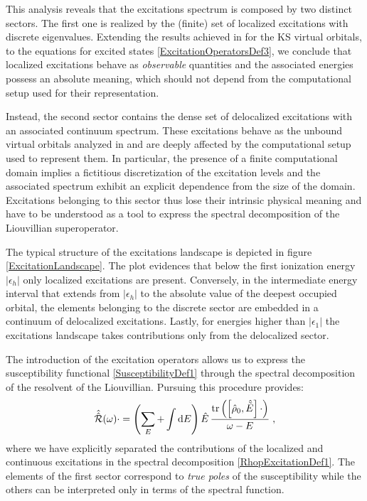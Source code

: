 \documentclass[reprint,aps,prb]{revtex4-1}
\newcommand{\dd}{{\rm d}}
\newcommand{\eps}{\epsilon}
\newcommand{\be}{\begin{equation}}
\newcommand{\ee}{\end{equation}}
\newcommand{\lb}{\label}
\newcommand{\op}[1]{\hat {#1}}
\newcommand{\sop}[1]{\op{\op {#1}}}
\newcommand{\commutator}[2]{\left[ {#1} , {#2} \right]}
\newcommand{\trace}[1]{\mathrm{tr}\left(#1\right)}
\newcommand{\dmnot}{\op{\rho}_0}
\begin{document}
This analysis reveals that the excitations spectrum is composed by two distinct sectors. The first one is realized by the (finite) set of localized excitations with discrete eigenvalues. Extending 
the results achieved in \cite{boffi2016} for the KS virtual orbitals, to the equations for excited states \eqref{ExcitationOperatorsDef3}, we conclude that localized excitations behave as 
\emph{observable} quantities and the associated energies possess an absolute meaning, which should not depend from the computational setup used for their representation. 

Instead, the second sector contains the dense set of delocalized excitations with an associated continuum spectrum. These excitations behave as the unbound virtual orbitals analyzed in \cite{boffi2016} 
and are deeply affected by the computational setup used to represent them. In particular, the presence of a finite computational domain implies a fictitious discretization of the excitation levels and 
the associated spectrum exhibit an explicit dependence from the size of the domain. Excitations belonging to this sector thus lose their intrinsic physical meaning and have to be understood as a tool to 
express the spectral decomposition of the Liouvillian superoperator. 

The typical structure of the excitations landscape is depicted in figure \ref{ExcitationLandscape}. The plot evidences that below the first ionization energy $|\eps_h|$ only localized excitations are 
present. Conversely, in the intermediate energy interval that extends from $|\eps_h|$ to the absolute value of the deepest occupied orbital, the elements belonging to the discrete sector are embedded 
in a continuum of delocalized excitations. Lastly, for energies higher than $|\eps_1|$ the excitations landscape takes contributions only from the delocalized sector. 

The introduction of the excitation operators allows us to express the susceptibility functional \eqref{SusceptibilityDef1} through the spectral decomposition of the resolvent of the 
Liouvillian. Pursuing this procedure provides:
\be\lb{RhopExcitationDef1}
\sop{{\cal R}}(\omega) \cdot   =
\left(\sum_E + \int\dd E   \right) \op E \,
\frac{\trace{\commutator{\dmnot}{\op{\tilde E}}\cdot}}{\omega-E} \;,
\ee 
where we have explicitly separated the contributions of the localized and continuous excitations in the spectral decomposition \eqref{RhopExcitationDef1}. The elements of the first sector 
correspond to \emph{true poles} of the susceptibility while the others can be interpreted only in terms of the spectral function. 
\end{document}
